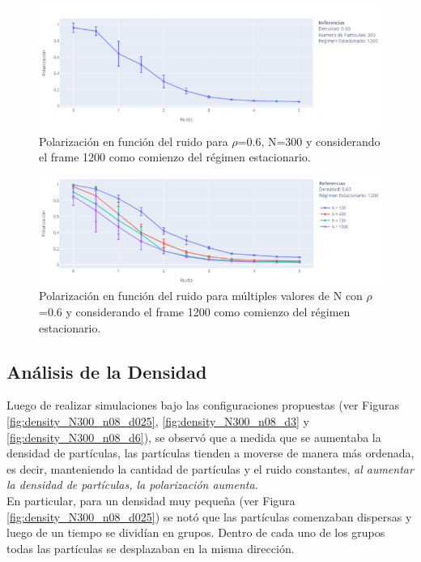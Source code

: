 \documentclass[12pt, a4paper]{report}
\begin{document}
\begin{figure}[h!]
\includegraphics[scale=0.5]{pola_vs_noise.png}
\centering 
\caption{Polarización en función del ruido para $\rho$=0.6, N=300 y considerando el frame 1200 como comienzo del régimen estacionario.}
\label{fig:pola_vs_noise}
\end{figure}
 
\begin{figure}[h!]
\includegraphics[scale=0.5]{pola_vs_noise_multiple_n.png}
\centering 
\caption{Polarización en función del ruido para múltiples valores de N con $\rho$=0.6 y considerando el frame 1200 como comienzo del régimen estacionario.}
\label{fig:pola_vs_noise_multiple_n}
\end{figure}

\subsection{Análisis de la Densidad}

Luego de realizar simulaciones bajo las configuraciones propuestas (ver Figuras \ref{fig:density_N300_n08_d025}, \ref{fig:density_N300_n08_d3} y \ref{fig:density_N300_n08_d6}), se observó que a medida que se aumentaba la densidad de partículas, las partículas tienden a moverse de manera más ordenada, es decir, manteniendo la cantidad de partículas y el ruido constantes, \emph{al aumentar la densidad de partículas, la polarización aumenta}.\\

En particular, para un densidad muy pequeña (ver Figura \ref{fig:density_N300_n08_d025}) se notó que las partículas comenzaban dispersas y luego de un tiempo se dividían en grupos. Dentro de cada uno de los grupos todas las partículas se desplazaban en la misma dirección. \\
\end{document}
